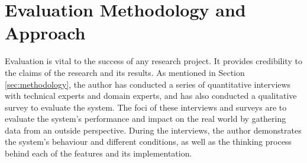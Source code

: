 \section{Evaluation Methodology and Approach} \label{sec:evaluation-methodology}

Evaluation is vital to the success of any research project. It provides credibility to the claims of the research and its results. As mentioned in Section \ref{sec:methodology}, the author has conducted a series of quantitative interviews with technical experts and domain experts, and has also conducted a qualitative survey to evaluate the system. The foci of these interviews and surveys are to evaluate the system's performance and impact on the real world by gathering data from an outside perspective. During the interviews, the author demonstrates the system's behaviour and different conditions, as well as the thinking process behind each of the features and its implementation.